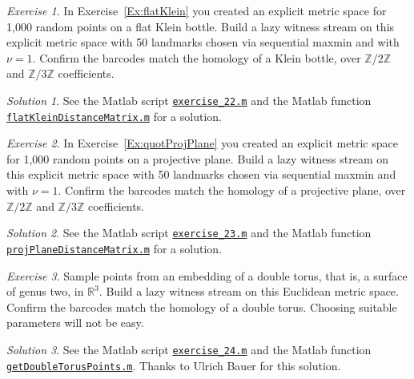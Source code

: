 \documentclass[amscd, amssymb, verbatim]{amsart}[12pt]
\theoremstyle{remark}
\theoremstyle{remark}
\newtheorem{exerciseSol}{Exercise}
\theoremstyle{remark}
\newtheorem*{solution}{Solution}
\newcommand{\R}{\mathbb{R}}
\newcommand{\Z}{\mathbb{Z}}
\begin{document}
\begin{exerciseSol}
In Exercise~\ref{Ex:flatKlein} you created an explicit metric space for 1,000 random points on a flat Klein bottle. Build a lazy witness stream on this explicit metric space with 50 landmarks chosen via sequential maxmin and with $\nu = 1$.  Confirm the barcodes match the homology of a Klein bottle, over $\Z/2\Z$ and $\Z/3\Z$ coefficients.
\end{exerciseSol}

\begin{solution}
See the Matlab script \href{https://github.com/appliedtopology/javaplex/tree/master/src/matlab/for_distribution/tutorial_solutions/exercise_22.m}{\texttt{exercise\_22.m}} and the Matlab function \href{https://github.com/appliedtopology/javaplex/tree/master/src/matlab/for_distribution/tutorial_solutions/flatKleinDistanceMatrix.m}{\texttt{flatKleinDistanceMatrix.m}} for a solution.
\end{solution}

\begin{exerciseSol}
In Exercise~\ref{Ex:quotProjPlane} you created an explicit metric space for 1,000 random points on a projective plane. Build a lazy witness stream on this explicit metric space with 50 landmarks chosen via sequential maxmin and with $\nu = 1$.  Confirm the barcodes match the homology of a projective plane, over $\Z/2\Z$ and $\Z/3\Z$ coefficients.
\end{exerciseSol}

\begin{solution}
See the Matlab script \href{https://github.com/appliedtopology/javaplex/tree/master/src/matlab/for_distribution/tutorial_solutions/exercise_23.m}{\texttt{exercise\_23.m}} and the Matlab function \href{https://github.com/appliedtopology/javaplex/tree/master/src/matlab/for_distribution/tutorial_solutions/projPlaneDistanceMatrix.m}{\texttt{projPlaneDistanceMatrix.m}} for a solution.
\end{solution}

\begin{exerciseSol}
Sample points from an embedding of a double torus, that is, a surface of genus two, in $\R^3$. Build a lazy witness stream on this Euclidean metric space. Confirm the barcodes match the homology of a double torus. Choosing suitable parameters will not be easy.
\end{exerciseSol}

\begin{solution}
See the Matlab script \href{https://github.com/appliedtopology/javaplex/tree/master/src/matlab/for_distribution/tutorial_solutions/exercise_24.m}{\texttt{exercise\_24.m}} and the Matlab function \href{https://github.com/appliedtopology/javaplex/tree/master/src/matlab/for_distribution/tutorial_solutions/getDoubleTorusPoints.m}{\texttt{getDoubleTorusPoints.m}}. Thanks to Ulrich Bauer for this solution.
\end{solution}





\end{document}
